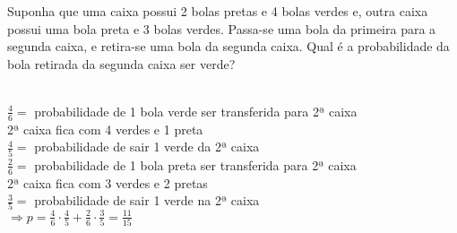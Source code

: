 \begin{ex}
Suponha que uma caixa possui 2 bolas pretas e 4 bolas verdes e, outra caixa possui uma bola preta e 3 bolas verdes. Passa-se uma bola da primeira para a segunda caixa, e retira-se uma bola da segunda caixa. Qual é a probabilidade da bola retirada da segunda caixa ser verde?
  \begin{sol}
   \phantom{A} \\
   $\frac{4}{6}=$ probabilidade de 1 bola verde ser transferida para 2ª caixa \\
   2ª caixa fica com 4 verdes e 1 preta \\
   $\frac{4}{5}=$ probabilidade de sair 1 verde da 2ª caixa \\
   $\frac{2}{6}=$ probabilidade de 1 bola preta ser transferida para 2ª caixa \\
   2ª caixa fica com 3 verdes e 2 pretas \\
   $\frac{3}{5}=$ probabilidade de sair 1 verde na 2ª caixa \\
   $\Longrightarrow p= \frac{4}{6}\cdot\frac{4}{5}+\frac{2}{6}\cdot\frac{3}{5}=\frac{11}{15}$
  \end{sol}
\end{ex}